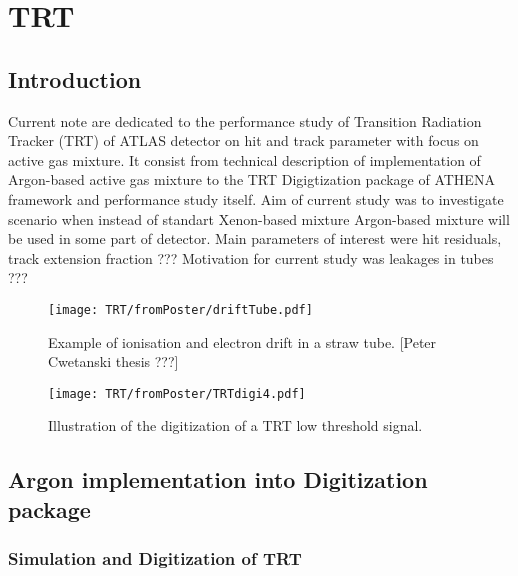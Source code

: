 \chapter{TRT}
\label{chap:TRT}

\section{Introduction}
\label{sec:TRT:introduction}






Current note are dedicated to the performance study of Transition Radiation Tracker (TRT) of ATLAS detector on hit and track parameter with focus on active gas mixture.
It consist from technical description of implementation of Argon-based active gas mixture to the TRT Digigtization package of ATHENA framework and performance study itself. 
Aim of current study was to investigate scenario when instead of standart Xenon-based mixture Argon-based mixture will be used in some part of detector. Main parameters of interest
were hit residuals, track extension fraction ???
Motivation for current study was leakages in tubes ???

\begin{figure}[h]
\begin{center}
 \texttt{[image: TRT/fromPoster/driftTube.pdf]}
\caption{\label{fig:clusterDriftInTube} Example of ionisation and electron drift in a straw tube. [Peter Cwetanski thesis ???]}
\end{center}
\end{figure}

\begin{figure}[h]
\begin{center}
 \texttt{[image: TRT/fromPoster/TRTdigi4.pdf]}
\caption{\label{fig:pulseDigitization} Illustration of the digitization of a TRT low threshold signal.}
\end{center}
\end{figure}



\section{Argon implementation into Digitization package}
\label{sec:TRT:argonImpl}


\subsection{Simulation and Digitization of TRT}

